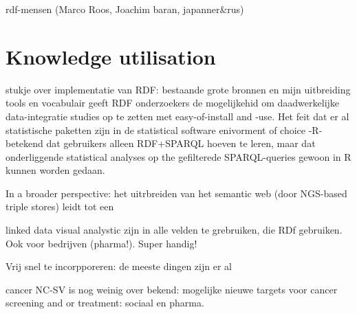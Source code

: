 \documentclass[twoside,fontsize=10pt]{article}
\renewcommand\thesection{\Roman{section}} %
\begin{document}
rdf-mensen (Marco Roos, Joachim baran, japanner\&rus)
\section*{Knowledge utilisation}
stukje over implementatie van RDF: bestaande grote bronnen en mijn uitbreiding tools en vocabulair geeft RDF onderzoekers de mogelijkehid om daadwerkelijke data-integratie studies op te zetten met easy-of-install and -use. Het feit dat er al statistische paketten zijn in de statistical software enivorment of choice -R- betekend dat gebruikers alleen RDF+SPARQL hoeven te leren, maar dat onderliggende statistical analyses op the gefilterede SPARQL-queries gewoon in R kunnen worden gedaan.  

In a broader perspective: het uitrbreiden van het semantic web (door NGS-based triple stores) leidt tot een 

linked data visual analystic zijn in alle velden te grebruiken, die RDf gebruiken. Ook voor bedrijven (pharma!). Super handig!

Vrij snel te incorpporeren: de meeste dingen zijn er al

cancer NC-SV is nog weinig over bekend: mogelijke nieuwe targets voor cancer screening and or treatment: sociaal en pharma.






\begin{tiny}


 \end{tiny}
%
%
\end{document}

